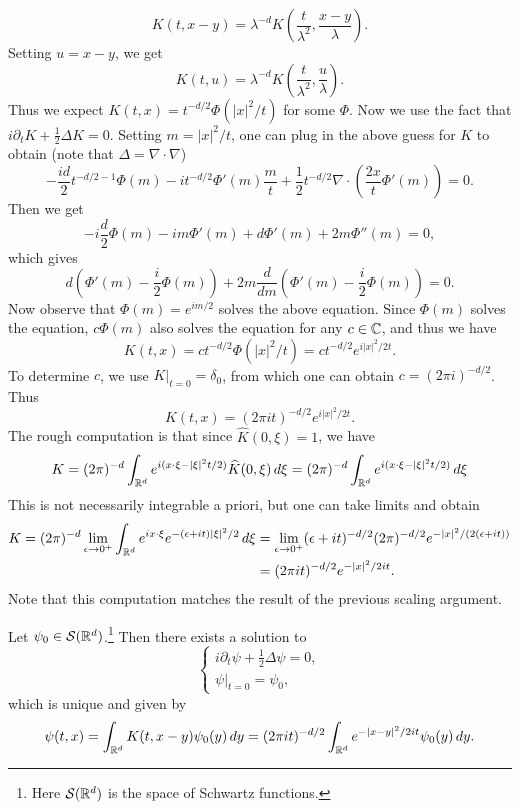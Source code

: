 \begin{example}
\begin{enumerate}
      \[
        K(t, x - y) = \lambda^{-d} K\left(\frac{t}{\lambda^2}, \frac{x - y}{\lambda}\right).
      \]
      Setting $u = x - y$, we get
      \[
        K(t, u) = \lambda^{-d} K\left(\frac{t}{\lambda^2}, \frac{u}{\lambda}\right).
      \]
      Thus we expect
      $K(t, x) = t^{-d / 2} \Phi(|x|^2 / t)$
      for some $\Phi$. Now we use the fact that
      $i \partial_t K + \frac{1}{2} \Delta K = 0$.
      Setting $m = |x|^2 / t$, one can
      plug in the above guess for $K$ to obtain
      (note that $\Delta = \nabla \cdot \nabla$)
      \[
        -\frac{id}{2} t^{-d / 2 - 1} \Phi(m)
        - it^{-d / 2} \Phi'(m) \frac{m}{t}
        + \frac{1}{2} t^{-d / 2} \nabla \cdot \left(\frac{2x}{t} \Phi'(m)\right) = 0.
      \]
      Then we get
      \[
        -i \frac{d}{2} \Phi(m) - im \Phi'(m)
        + d \Phi'(m) + 2m \Phi''(m) = 0,
      \]
      which gives
      \[
        d\left(\Phi'(m) - \frac{i}{2} \Phi(m)\right)
        + 2m \frac{d}{dm} \left(\Phi'(m) - \frac{i}{2}\Phi(m)\right) = 0.
      \]
      Now observe that
      $\Phi(m) = e^{im / 2}$ solves the above equation.
      Since $\Phi(m)$ solves the
      equation, $c \Phi(m)$ also solves the equation for
      any $c \in \mathbb{C}$, and thus we have
      \[
        K(t, x) = c t^{-d / 2} \Phi(|x|^2 / t)
        = c t^{-d / 2} e^{i|x|^2 / 2t}.
      \]
      To determine $c$, we use $K|_{t = 0} = \delta_0$,
      from which one can obtain $c = (2\pi i)^{-d / 2}$. Thus
      \[
        K(t, x) = (2\pi it)^{-d / 2} e^{i|x|^2 / 2t}.
      \]
      The rough computation is that since
      $\widehat{K}(0, \xi) = 1$, we have
      \[
        K = (2\pi)^{-d} \int_{\mathbb{R}^d} e^{i(x \cdot \xi - |\xi|^2 t / 2)} \widehat{K}(0, \xi)\, d\xi
        = (2\pi)^{-d} \int_{\mathbb{R}^d} e^{i(x \cdot \xi - |\xi|^2 t / 2)}\, d\xi
      \]
      This is not necessarily integrable a priori,
      but one can take limits and obtain
      \begin{align*}
        K
        = (2\pi)^{-d} \lim_{\epsilon \to 0^+}
        \int_{\mathbb{R}^d} e^{ix \cdot \xi} e^{-(\epsilon + it)|\xi|^2 / 2}\, d\xi
        &= \lim_{\epsilon \to 0^+} (\epsilon + it)^{-d / 2} (2\pi)^{-d / 2} e^{-|x|^2 / (2(\epsilon + it))} \\
        &= (2\pi it)^{-d / 2} e^{-|x|^2 / 2it}.
      \end{align*}
      Note that this computation matches the result
      of the previous scaling argument.
  \end{enumerate}
\end{example}

\begin{theorem}
  Let $\psi_0 \in \mathcal{S}(\mathbb{R}^d)$.\footnote{Here $\mathcal{S}(\mathbb{R}^d)$ is the space of Schwartz functions.}
  Then there exists a solution to
  \[
    \begin{cases}
      i \partial_t \psi + \frac{1}{2} \Delta \psi = 0, \\
      \psi|_{t = 0} = \psi_0,
    \end{cases}
  \]
  which is unique and given by
  \[
    \psi(t, x) = \int_{\mathbb{R}^d} K(t, x - y) \psi_0(y)\, dy
    = (2\pi it)^{-d / 2} \int_{\mathbb{R}^d} e^{-|x - y|^2 / 2it} \psi_0(y)\, dy.
  \]
\end{theorem}

